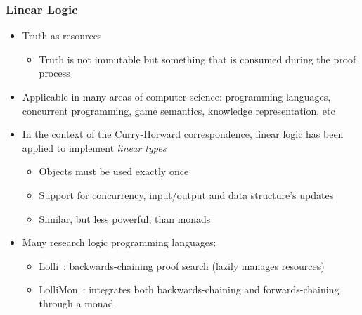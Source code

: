 \documentclass{beamer}
\begin{document}
\frame
{
   \frametitle{Linear Logic}
   \begin{itemize}
      \item Truth as resources
      \begin{itemize}
         \item Truth is not immutable but something that is consumed during the proof process
      \end{itemize}
      \item Applicable in many areas of computer science: programming languages, concurrent programming, game semantics, knowledge representation, etc
      \item In the context of the Curry-Horward correspondence, linear logic has been applied to implement \emph{linear types}
      \begin{itemize}
         \item Objects must be used exactly once
         \item Support for concurrency, input/output and data structure's updates
         \item Similar, but less powerful, than monads
      \end{itemize}
      \item Many research logic programming languages:
      \begin{itemize}
         \item Lolli~\cite{Hodas94logicprogramming}: backwards-chaining proof search (lazily manages resources)
         \item LolliMon~\cite{Lopez:2005:MCL:1069774.1069778}: integrates both backwards-chaining and forwards-chaining through a monad
      \end{itemize}
   \end{itemize}
}
\end{document}
